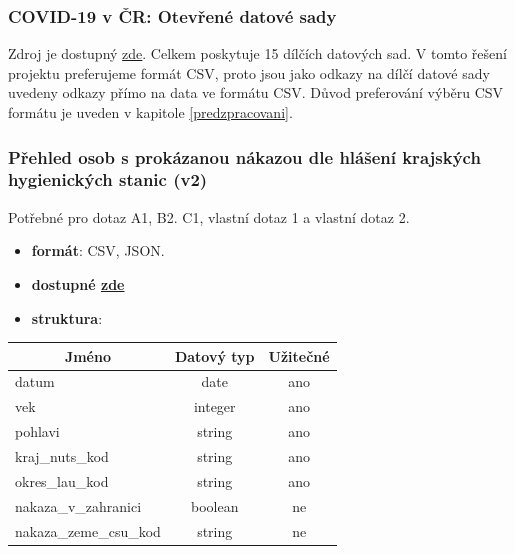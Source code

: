 \documentclass[12pt]{article}
\begin{document}
\subsubsection{COVID-19 v ČR: Otevřené datové sady}
\label{data1}
Zdroj je dostupný \href{https://onemocneni-aktualne.mzcr.cz/api/v2/covid-19}{zde}. Celkem poskytuje 15 dílčích datových sad. V tomto řešení projektu preferujeme formát CSV, proto jsou jako odkazy na dílčí datové sady uvedeny odkazy přímo na data ve formátu CSV. Důvod preferování výběru CSV formátu je uveden v kapitole \ref{predzpracovani}.


\subsubsection*{Přehled osob s prokázanou nákazou dle hlášení krajských hygienických stanic (v2)}
Potřebné pro dotaz A1, B2. C1, vlastní dotaz 1 a vlastní dotaz 2.
\begin{itemize}
    \item \textbf{formát}: CSV, JSON.
    \item \textbf{dostupné  \href{https://onemocneni-aktualne.mzcr.cz/api/v2/covid-19/osoby.csv}{zde}}
    \item \textbf{struktura}:
\end{itemize}
        \begin{center}
            \begin{tabular}{ |l|c|c| }
                \hline
                \multicolumn{1}{|c|}{Jméno} & Datový typ & Užitečné \\
                \hline
                \hline
                datum & date & ano \\
                \hline
                vek & integer & ano \\
                \hline
                pohlavi & string & ano \\
                \hline
                kraj\_nuts\_kod & string & ano \\
                \hline
                okres\_lau\_kod & string & ano \\
                \hline
                nakaza\_v\_zahranici & boolean & ne \\
                \hline
                nakaza\_zeme\_csu\_kod & string & ne \\
                \hline
            \end{tabular}
        \end{center}

\newpage
\end{document}
